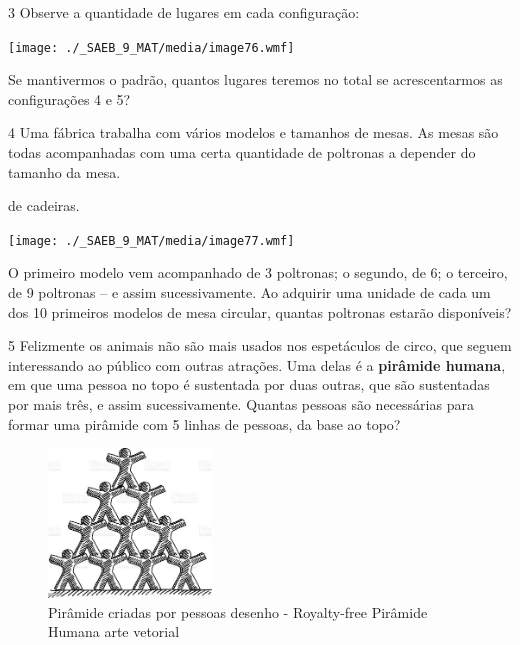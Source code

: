 \begin{escolha}
{{{\begin{escolha}
{\num{3} Observe a quantidade de lugares em cada configuração:


\texttt{[image: ./\_SAEB\_9\_MAT/media/image76.wmf]}

Se mantivermos o padrão, quantos lugares teremos no total se
acrescentarmos as configurações 4 e 5?


\num{4} Uma fábrica trabalha com vários modelos e tamanhos de mesas. As mesas
são todas acompanhadas com uma certa quantidade de poltronas a depender
do tamanho da mesa.

de cadeiras.

\texttt{[image: ./\_SAEB\_9\_MAT/media/image77.wmf]}

O primeiro modelo vem acompanhado de 3 poltronas; o segundo, de 6; o 
terceiro, de 9 poltronas -- e assim sucessivamente. Ao adquirir uma
unidade de cada um dos 10 primeiros modelos de mesa circular, quantas
poltronas estarão disponíveis?


\num{5} Felizmente os animais não são mais usados nos espetáculos de circo,
que seguem interessando ao público com outras atrações. Uma delas é a 
\textbf{pirâmide humana}, em que uma pessoa no topo é sustentada por duas
outras, que são sustentadas por mais três, e assim sucessivamente. Quantas
pessoas são necessárias para formar uma pirâmide com 5 linhas de pessoas,
da base ao topo?

\begin{figure}
\centering
\includegraphics[width=1.71354in,height=1.56302in]{./_SAEB_9_MAT/media/image82.jpeg}
\caption{Pirâmide criadas por pessoas desenho - Royalty-free Pirâmide
Humana arte vetorial}
\end{figure}

}
\end{escolha}}}}
\end{escolha}
